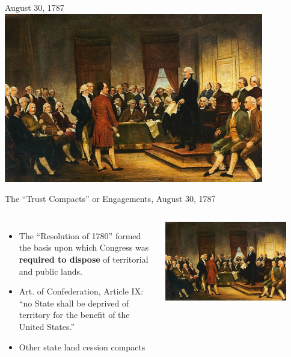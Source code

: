 \begin{frame}{August 30, 1787}
    \centering
    \includegraphics[width=0.85\textwidth]{img/convention.png} \\
\end{frame}

\begin{frame}{The ``Trust Compacts'' or Engagements, August 30, 1787}
    \begin{columns}[onlytextwidth]
            \vspace{10pt}
            \begin{itemize}
                \item The ``Resolution of 1780'' formed the basis upon which Congress was \textbf{required to dispose} of territorial and public lands.
                \item Art. of Confederation, Article IX: ``no State shall be deprived of territory for the benefit of the United States.''
                \item Other state land cession compacts
            \end{itemize}
            \centering
            \includegraphics[width=0.85\textwidth]{img/convention.png} \\
    \end{columns}
\end{frame}

